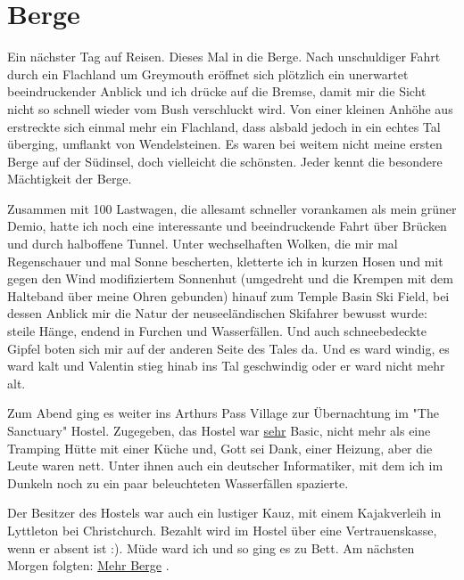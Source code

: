 \chapter{Berge}

Ein nächster Tag auf Reisen. Dieses Mal in die Berge. Nach unschuldiger
Fahrt durch ein Flachland um Greymouth eröffnet sich plötzlich ein
unerwartet beeindruckender Anblick und ich drücke auf die Bremse, damit
mir die Sicht nicht so schnell wieder vom Bush verschluckt wird. Von
einer kleinen Anhöhe aus erstreckte sich einmal mehr ein Flachland, dass
alsbald jedoch in ein echtes Tal überging, umflankt von Wendelsteinen.
Es waren bei weitem nicht meine ersten Berge auf der Südinsel, doch
vielleicht die schönsten. Jeder kennt die besondere Mächtigkeit der
Berge.

Zusammen mit 100 Lastwagen, die allesamt schneller vorankamen als mein
grüner Demio, hatte ich noch eine interessante und beeindruckende Fahrt
über Brücken und durch halboffene Tunnel. Unter wechselhaften Wolken,
die mir mal Regenschauer und mal Sonne bescherten, kletterte ich in
kurzen Hosen und mit gegen den Wind modifiziertem Sonnenhut (umgedreht
und die Krempen mit dem Halteband über meine Ohren gebunden) hinauf zum
Temple Basin Ski Field, bei dessen Anblick mir die Natur der
neuseeländischen Skifahrer bewusst wurde: steile Hänge, endend in
Furchen und Wasserfällen. Und auch schneebedeckte Gipfel boten sich mir
auf der anderen Seite des Tales da. Und es ward windig, es ward kalt und
Valentin stieg hinab ins Tal geschwindig oder er ward nicht mehr alt.

Zum Abend ging es weiter ins Arthurs Pass Village zur Übernachtung im
"The Sanctuary" Hostel. Zugegeben, das Hostel war \underline{sehr}
Basic, nicht mehr als eine Tramping Hütte mit einer Küche und, Gott sei
Dank, einer Heizung, aber die Leute waren nett. Unter ihnen auch ein
deutscher Informatiker, mit dem ich im Dunkeln noch zu ein paar
beleuchteten Wasserfällen spazierte.

Der Besitzer des Hostels war auch ein lustiger Kauz, mit einem
Kajakverleih in Lyttleton bei Christchurch. Bezahlt wird im Hostel über
eine Vertrauenskasse, wenn er absent ist :). Müde ward ich und so ging
es zu Bett. Am nächsten Morgen folgten: \underline{Mehr Berge} .
